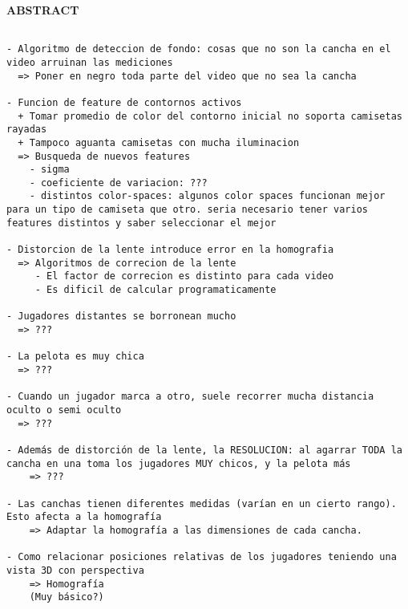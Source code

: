 \documentclass[a4paper,10pt]{article}
\title{}
\date{20 de Septiembre de 2013}
\author{Civile, Juan Pablo \and Crespo, Álvaro \and Ordano, Esteban }
\begin{document}
\pagestyle{fancy}
\maketitle
\thispagestyle{fancy}


\begin{customabstract}
\textbf{
ABSTRACT
} \end{customabstract}

\begin{verbatim}

- Algoritmo de deteccion de fondo: cosas que no son la cancha en el video arruinan las mediciones
  => Poner en negro toda parte del video que no sea la cancha

- Funcion de feature de contornos activos
  + Tomar promedio de color del contorno inicial no soporta camisetas rayadas
  + Tampoco aguanta camisetas con mucha iluminacion
  => Busqueda de nuevos features
    - sigma
    - coeficiente de variacion: ???
    - distintos color-spaces: algunos color spaces funcionan mejor para un tipo de camiseta que otro. seria necesario tener varios features distintos y saber seleccionar el mejor

- Distorcion de la lente introduce error en la homografia
  => Algoritmos de correcion de la lente
     - El factor de correcion es distinto para cada video
     - Es dificil de calcular programaticamente

- Jugadores distantes se borronean mucho
  => ???

- La pelota es muy chica
  => ???

- Cuando un jugador marca a otro, suele recorrer mucha distancia oculto o semi oculto
  => ???

- Además de distorción de la lente, la RESOLUCION: al agarrar TODA la cancha en una toma los jugadores MUY chicos, y la pelota más
    => ???

- Las canchas tienen diferentes medidas (varían en un cierto rango). Esto afecta a la homografía
    => Adaptar la homografía a las dimensiones de cada cancha.

- Como relacionar posiciones relativas de los jugadores teniendo una vista 3D con perspectiva
    => Homografía
    (Muy básico?)

\end{verbatim}
\end{document}
